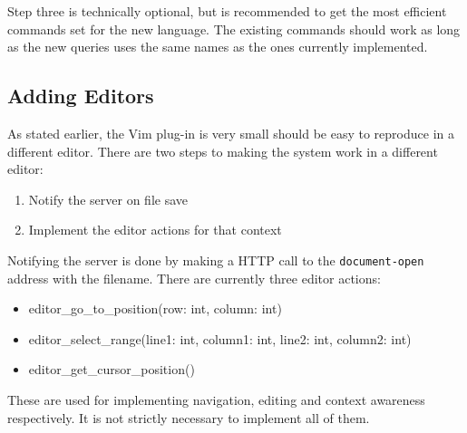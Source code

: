 \documentclass[../thesis.tex]{subfiles}
\begin{document}
Step three is technically optional, but is recommended to get the most efficient commands set for the new language.
The existing commands should work as long as the new queries uses the same names as the ones currently implemented.

\subsection{Adding Editors}%
\label{sec:adding_editors}
As stated earlier, the Vim plug-in is very small should be easy to reproduce in a different editor.
There are two steps to making the system work in a different editor:
\begin{enumerate}
    \item Notify the server on file save
    \item Implement the editor actions for that context
\end{enumerate}
Notifying the server is done by making a HTTP call to the \texttt{document-open} address with the filename.
There are currently three editor actions:
\begin{itemize}
    \item editor\_go\_to\_position(row: int, column: int)
    \item editor\_select\_range(line1: int, column1: int, line2: int, column2: int)
    \item editor\_get\_cursor\_position()
\end{itemize}
These are used for implementing navigation, editing and context awareness respectively.
It is not strictly necessary to implement all of them.
\end{document}
